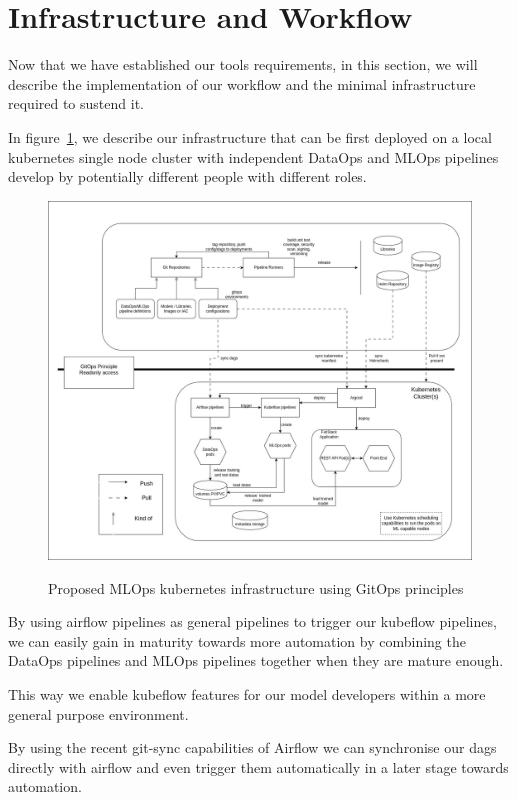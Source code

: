 \section{Infrastructure and Workflow}\label{sec:infrastructure}

Now that we have established our tools requirements, in this section,
we will describe the implementation of our workflow and the minimal infrastructure required to sustend it.

In figure~\ref{fig:project-infra}, we describe our infrastructure that can be first deployed on a local kubernetes single node cluster
with independent DataOps and MLOps pipelines develop by potentially different people with different roles.

\begin{figure}[!htbp]
    \centering
    \caption{Proposed MLOps kubernetes infrastructure using GitOps principles}
    \includegraphics[scale=0.35]{images/project/mthmlops-infra}
    \label{fig:project-infra}
\end{figure}

By using airflow pipelines as general pipelines to trigger our kubeflow pipelines, we can easily gain in maturity towards
more automation by combining the DataOps pipelines and MLOps pipelines together when they are mature enough.

This way we enable kubeflow features for our model developers within a more general purpose environment.

By using the recent git-sync capabilities of Airflow we can synchronise our dags directly with airflow and
even trigger them automatically in a later stage towards automation.

